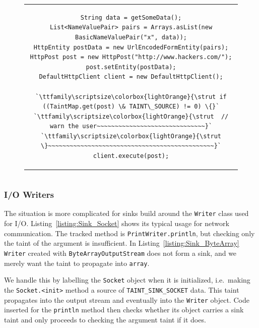\documentclass[12pt,twoside,notitlepage]{report}
\newcommand{\highlight}[1]{\colorbox{lightOrange}{\strut #1}}
\newcommand{\lsthl}[1] {\ttfamily\scriptsize\highlight{#1}}
\begin{document}
\begin{figure}
	\centering
	\begin{tabular}{c}
	\begin{lstlisting}
String data = getSomeData();
List<NameValuePair> pairs = Arrays.asList(new BasicNameValuePair("x", data));
HttpEntity postData = new UrlEncodedFormEntity(pairs);
HttpPost post = new HttpPost("http://www.hackers.com/");
post.setEntity(postData);
DefaultHttpClient client = new DefaultHttpClient();

`\lsthl{if ((TaintMap.get(post) \& TAINT\_SOURCE) != 0) \{}`
`\lsthl{ // warn the user~~~~~~~~~~~~~~~~~~~~~~~~~~~~~~}`
`\lsthl{\}~~~~~~~~~~~~~~~~~~~~~~~~~~~~~~~~~~~~~~~~~~~~~~}`
client.execute(post);
	\end{lstlisting}
	\end{tabular}
	\begin{lstlisting}[caption={HTTP request using the Apache client, with sink instrumentation},
	                   label={listing:Sink_ApacheHTTPClient}]
	\end{lstlisting}
\end{figure}

\subsubsection{I/O Writers}

The situation is more complicated for sinks build around the \verb$Writer$ class used for I/O. Listing~\ref{listing:Sink_Socket} shows its typical usage for network communication. The tracked method is \verb$PrintWriter.println$, but checking only the taint of the argument is insufficient. In Listing~\ref{listing:Sink_ByteArray} \verb$Writer$ created with \verb$ByteArrayOutputStream$ does not form a sink, and we merely want the taint to propagate into \verb$array$. 

We handle this by labelling the \verb$Socket$ object when it is initialized, i.e.\ making the \verb$Socket.<init>$ method a source of \verb$TAINT_SINK_SOCKET$ data. This taint propagates into the output stream and eventually into the \verb$Writer$ object. Code inserted for the \verb$println$ method then checks whether its object carries a sink taint and only proceeds to checking the argument taint if it does.
\end{document}
